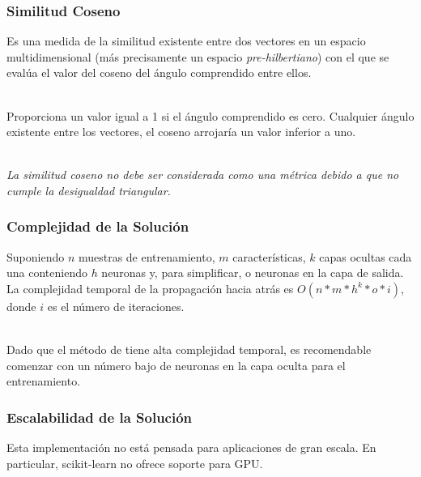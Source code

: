 \documentclass{beamer}
\begin{document}
    \begin{frame}
        \frametitle{Similitud Coseno}

        \hspace*{20pt}Es una medida de la similitud existente entre dos vectores en un espacio multidimensional 
        (más precisamente un espacio \textit{pre-hilbertiano}) con el que se evalúa el valor del coseno del ángulo comprendido 
        entre ellos.\\~\

        \hspace*{20pt}Proporciona un valor igual a 1 si el ángulo comprendido es cero. Cualquier ángulo existente entre los vectores, 
        el coseno arrojaría un valor inferior a uno. \\~\

        \hspace*{20pt}\textit{\scriptsize{La similitud coseno no debe ser considerada como una métrica debido a que no cumple la desigualdad triangular.}}
    \end{frame}

    \begin{frame}
        \frametitle{Complejidad de la Solución}

        \hspace*{20pt}Suponiendo $n$ muestras de entrenamiento, $m$ características, $k$ capas ocultas cada una conteniendo $h$ 
        neuronas y, para simplificar, o neuronas en la capa de salida. La complejidad temporal de la propagación hacia atrás es 
        $O(n*m*h^k*o*i)$, donde $i$ es el número de iteraciones.\\~\
        
        \hspace*{20pt}Dado que el método de  tiene alta complejidad temporal, es recomendable comenzar con un número 
        bajo de neuronas en la capa oculta para el entrenamiento.

    \end{frame}  

    \begin{frame}
        \frametitle{Escalabilidad de la Solución}

        \hspace*{20pt}Esta implementación no está pensada para aplicaciones de gran escala. 
        En particular, scikit-learn no ofrece soporte para GPU.


    \end{frame}  
\end{document}
